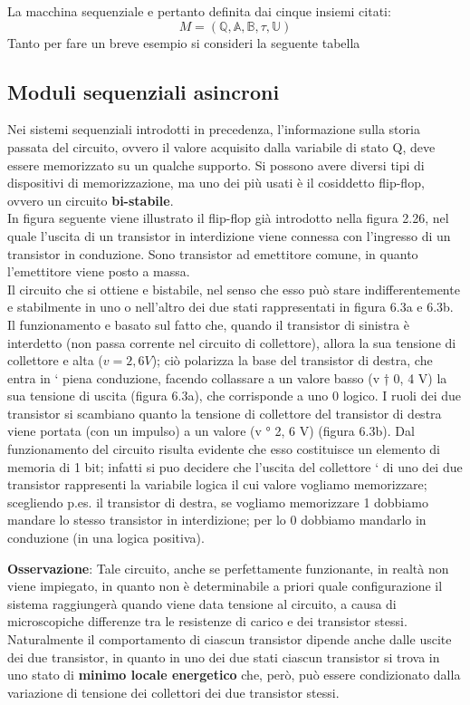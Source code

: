 \documentclass[a4paper]{extarticle}
\begin{document}
\vspace{1em}
\noindent
La macchina sequenziale e pertanto definita dai cinque insiemi citati:
\[M = \left(\mathbb{Q}, \mathbb{A}, \mathbb{B}, \tau, \mathbb{U} \right)\]
Tanto per fare un breve esempio si consideri la seguente tabella

\subsection{Moduli sequenziali asincroni}
Nei sistemi sequenziali introdotti in precedenza, l’informazione sulla storia passata del circuito, ovvero il valore acquisito dalla variabile di stato Q, deve essere memorizzato su un qualche supporto. Si possono
avere diversi tipi di dispositivi di memorizzazione, ma uno dei più usati è il cosiddetto flip-flop, ovvero un circuito \textbf{bi-stabile}.\\
In figura seguente viene illustrato il flip-flop già introdotto nella figura 2.26, nel quale l’uscita di un transistor in interdizione viene connessa con l’ingresso di un transistor in conduzione. Sono transistor ad emettitore comune, in quanto l'emettitore viene posto a massa.\\
Il circuito che si ottiene e bistabile, nel senso che esso può stare indifferentemente e stabilmente in uno o nell'altro dei due stati rappresentati in figura 6.3a e 6.3b. Il funzionamento e basato sul fatto che, quando il transistor di sinistra è interdetto (non passa corrente nel circuito di collettore), allora la sua tensione di collettore e alta (\(v = 2,6 V\)); ciò polarizza la base del transistor di destra, che entra in `
piena conduzione, facendo collassare a un valore basso (v † 0, 4 V) la sua tensione di uscita (figura 6.3a), che
corrisponde a uno 0 logico. I ruoli dei due transistor si scambiano quanto la tensione di collettore del transistor di
destra viene portata (con un impulso) a un valore (v ° 2, 6 V) (figura 6.3b). Dal funzionamento del circuito risulta
evidente che esso costituisce un elemento di memoria di 1 bit; infatti si puo decidere che l’uscita del collettore `
di uno dei due transistor rappresenti la variabile logica il cui valore vogliamo memorizzare; scegliendo p.es. il
transistor di destra, se vogliamo memorizzare 1 dobbiamo mandare lo stesso transistor in interdizione; per lo 0
dobbiamo mandarlo in conduzione (in una logica positiva).

\vspace{1em}
\noindent
\textbf{Osservazione}: Tale circuito, anche se perfettamente funzionante, in realtà non viene impiegato, in quanto non è determinabile a priori quale configurazione il sistema raggiungerà quando viene data tensione al circuito, a causa di microscopiche differenze tra le resistenze di carico e dei transistor stessi.\\
Naturalmente il comportamento di ciascun transistor dipende anche dalle uscite dei due transistor, in quanto in uno dei due stati ciascun transistor si trova in uno stato di \textbf{minimo locale energetico} che, però, può essere condizionato dalla variazione di tensione dei collettori dei due transistor stessi.
\end{document}
